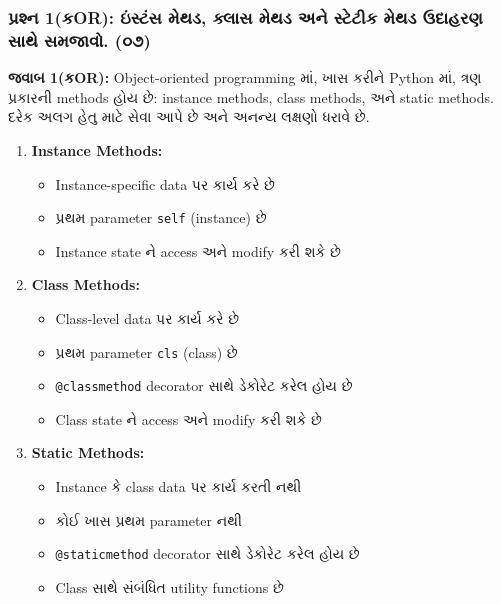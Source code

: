\hypertarget{uxaaauxab0uxab6uxaa8-1uxa95or-uxa87uxab8uxa9fuxab8-uxaaeuxaa5uxaa1-uxa95uxab2uxab8-uxaaeuxaa5uxaa1-uxa85uxaa8-uxab8uxa9fuxa9fuxa95-uxaaeuxaa5uxaa1-uxa89uxaa6uxab9uxab0uxaa3-uxab8uxaa5-uxab8uxaaeuxa9cuxab5.-uxae6uxaed}{%
\subsubsection{પ્રશ્ન 1(કOR): ઇંસ્ટંસ મેથડ, ક્લાસ મેથડ અને સ્ટેટીક મેથડ ઉદાહરણ સાથે
સમજાવો.
(૦૭)}\label{uxaaauxab0uxab6uxaa8-1uxa95or-uxa87uxab8uxa9fuxab8-uxaaeuxaa5uxaa1-uxa95uxab2uxab8-uxaaeuxaa5uxaa1-uxa85uxaa8-uxab8uxa9fuxa9fuxa95-uxaaeuxaa5uxaa1-uxa89uxaa6uxab9uxab0uxaa3-uxab8uxaa5-uxab8uxaaeuxa9cuxab5.-uxae6uxaed}}

\textbf{જવાબ 1(કOR):} Object-oriented programming માં, ખાસ કરીને Python
માં, ત્રણ પ્રકારની methods હોય છે: instance methods, class methods, અને
static methods. દરેક અલગ હેતુ માટે સેવા આપે છે અને અનન્ય લક્ષણો ધરાવે છે.

\begin{enumerate}
\def\labelenumi{\arabic{enumi}.}
\tightlist
\item
  \textbf{Instance Methods:}

  \begin{itemize}
  \tightlist
  \item
    Instance-specific data પર કાર્ય કરે છે
  \item
    પ્રથમ parameter \texttt{self} (instance) છે
  \item
    Instance state ને access અને modify કરી શકે છે
  \end{itemize}
\item
  \textbf{Class Methods:}

  \begin{itemize}
  \tightlist
  \item
    Class-level data પર કાર્ય કરે છે
  \item
    પ્રથમ parameter \texttt{cls} (class) છે
  \item
    \texttt{@classmethod} decorator સાથે ડેકોરેટ કરેલ હોય છે
  \item
    Class state ને access અને modify કરી શકે છે
  \end{itemize}
\item
  \textbf{Static Methods:}

  \begin{itemize}
  \tightlist
  \item
    Instance કે class data પર કાર્ય કરતી નથી
  \item
    કોઈ ખાસ પ્રથમ parameter નથી
  \item
    \texttt{@staticmethod} decorator સાથે ડેકોરેટ કરેલ હોય છે
  \item
    Class સાથે સંબંધિત utility functions છે
  \end{itemize}
\end{enumerate}

